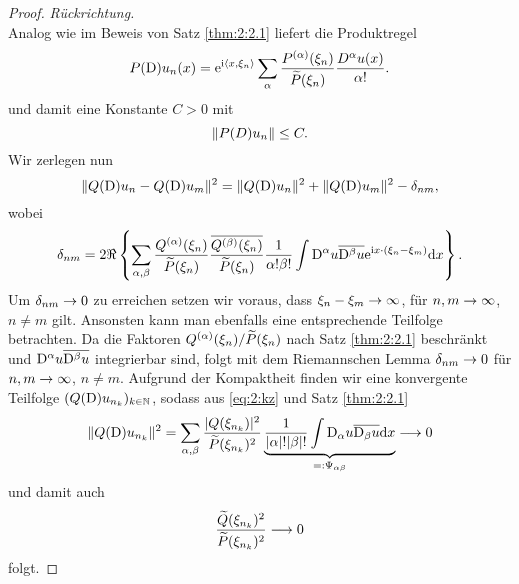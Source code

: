 \begin{proof} {\it Rückrichtung.}
\begin{equation}
\end{equation}
Analog wie im Beweis von Satz \ref{thm:2:2.1} liefert die Produktregel
\begin{equation}
P(\mathrm D)u_n(x)=\mathrm e^{\mathrm i\langle x,\xi_n\rangle}\sum_\alpha\frac{P^{(\alpha)}(\xi_n)}{\widetilde{P}(\xi_n)}\frac{D^\alpha u(x)}{\alpha!}.
\end{equation}
und damit eine Konstante $C>0$ mit
\begin{equation}\label{eq:2:PDunb}
\lVert P(D)u_n\rVert\leq C.
\end{equation}
Wir zerlegen nun
\begin{equation}\label{eq:2:kz}
\lVert Q(\mathrm D)u_n-Q(\mathrm D)u_m\rVert^2=\lVert Q(\mathrm D)u_n\rVert^2+\lVert Q(\mathrm D)u_m\rVert^2-\delta_{nm},
\end{equation}
wobei
\begin{equation}
\delta_{nm}=2\Re\left\{\sum_{\alpha,\beta}\frac{Q^{(\alpha)}(\xi_n)}{\widetilde{P}(\xi_n)}\frac{\overline{Q^{(\beta)}(\xi_n)}}{\widetilde{P}(\xi_n)}
\frac1{\alpha!\beta!}\int \mathrm D^\alpha u\overline{\mathrm D^\beta u}\mathrm e^{\mathrm i x \cdot(\xi_n-\xi_m)}\mathrm{d} x\right\}.
\end{equation}
Um $\delta_{nm}\to0$ zu erreichen setzen wir voraus, dass $\xi_n-\xi_m\to\infty$, für $n,m\to\infty$, $n\neq m$ gilt. Ansonsten kann man ebenfalls eine entsprechende Teilfolge betrachten.
Da die Faktoren $Q^{(\alpha)}(\xi_n)/\widetilde{P}(\xi_n)$ nach Satz \ref{thm:2:2.1} beschränkt und $\mathrm D^\alpha u\overline{\mathrm D^\beta u}$ integrierbar sind, folgt mit dem Riemannschen Lemma $\delta_{nm}\to0$ für $n,m\to\infty$, $n\neq m$.
Aufgrund der Kompaktheit finden wir eine konvergente Teilfolge $(Q(\mathrm D)u_{n_k})_{k \in \mathbb{N}}$, sodass aus \eqref{eq:2:kz} und Satz \ref{thm:2:2.1}
\begin{equation}
\lVert Q(\mathrm D)u_{n_k}\rVert^2=\sum_{\alpha,\beta}\frac{\lvert Q(\xi_{n_k})\rvert^2}{\widetilde{P}(\xi_{n_k})^2} \underbrace{\frac{1}{|\alpha|! |\beta|!}\int \mathrm D_\alpha u \overline{\mathrm D_\beta u} \mathrm{d}x}_{=:\Psi_{\alpha \beta}} \longrightarrow 0
\end{equation}
und damit auch 
\begin{equation}
\frac{\widetilde{Q}(\xi_{n_k})^2}{\widetilde{P}(\xi_{n_k})^2} \longrightarrow 0
\end{equation}
folgt.
\end{proof}
